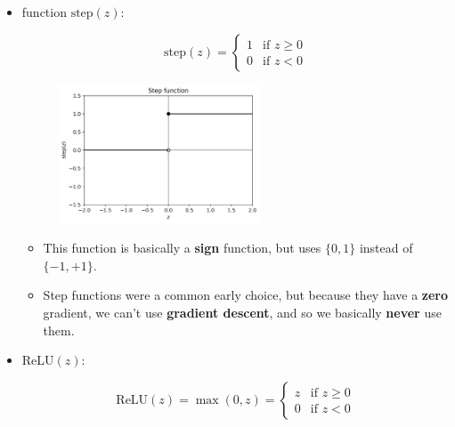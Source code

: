 \begin{itemize}
            
            \item {} function $\text{step}(z)$:
            
                \begin{equation}
                    \text{step}(z) 
                    =
                    \begin{cases}
                      1 & \text{if $z \geq 0$}\\
                      0 & \text{if $z < 0$}
                    \end{cases}
                \end{equation}
                
                \begin{figure}[H]
                    \centering
                    \includegraphics[width=60mm,scale=0.4]{images/nn_images/step_fn.png}
                \end{figure}
                
                \begin{itemize}
                    \item This function is basically a \textbf{sign} function, but uses $\{0, 1\}$ instead of $\{-1, +1\}$.
                    
                    \item Step functions were a common early choice, but because they have a \textbf{zero} gradient, we can't use \textbf{gradient descent}, and so we basically \textbf{never} use them.
                \end{itemize}
            
            
            \item {} ReLU$(z)$:
            
                \begin{equation}
                    \text{ReLU}(z) 
                    =
                    \max(0,z)
                    =
                    \begin{cases}
                      z & \text{if $z \geq 0$}\\
                      0 & \text{if $z < 0$}
                    \end{cases}
                \end{equation}
                

\end{itemize}

